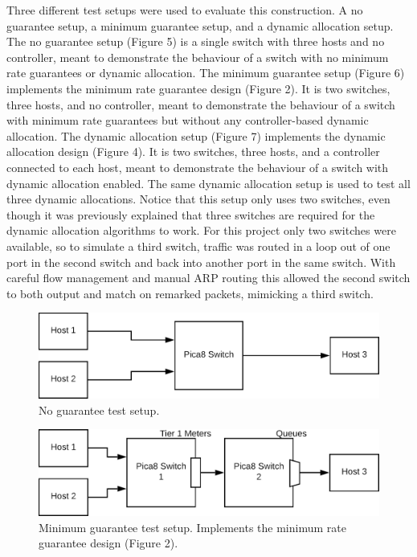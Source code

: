 \documentclass[accepted,single]{gipaper}
\begin{document}
Three different test setups were used to evaluate this construction. A no guarantee setup, a minimum guarantee setup, and a dynamic allocation setup. The no guarantee setup (Figure 5) is a single switch with three hosts and no controller, meant to demonstrate the behaviour of a switch with no minimum rate guarantees or dynamic allocation. The minimum guarantee setup (Figure 6) implements the minimum rate guarantee design (Figure 2). It is two switches, three hosts, and no controller, meant to demonstrate the behaviour of a switch with minimum rate guarantees but without any controller-based dynamic allocation. The dynamic allocation setup (Figure 7) implements the dynamic allocation design (Figure 4). It is two switches, three hosts, and a controller connected to each host, meant to demonstrate the behaviour of a switch with dynamic allocation enabled. The same dynamic allocation setup is used to test all three dynamic allocations. Notice that this setup only uses two switches, even though it was previously explained that three switches are required for the dynamic allocation algorithms to work. For this project only two switches were available, so to simulate a third switch, traffic was routed in a loop out of one port in the second switch and back into another port in the same switch. With careful flow management and manual ARP routing this allowed the second switch to both output and match on remarked packets, mimicking a third switch. 

\begin{figure}
	\centering
	\includegraphics[width=6in]{figs/no_guar_setup.png}
	\caption{ No guarantee test setup. } \label{no_guar_setup}
\end{figure}

\begin{figure}
	\centering
	\includegraphics[width=6in]{figs/min_guar_setup.png}
	\caption{ Minimum guarantee test setup. Implements the minimum rate guarantee design (Figure 2). } \label{min_guar_setup}
\end{figure}
\end{document}
